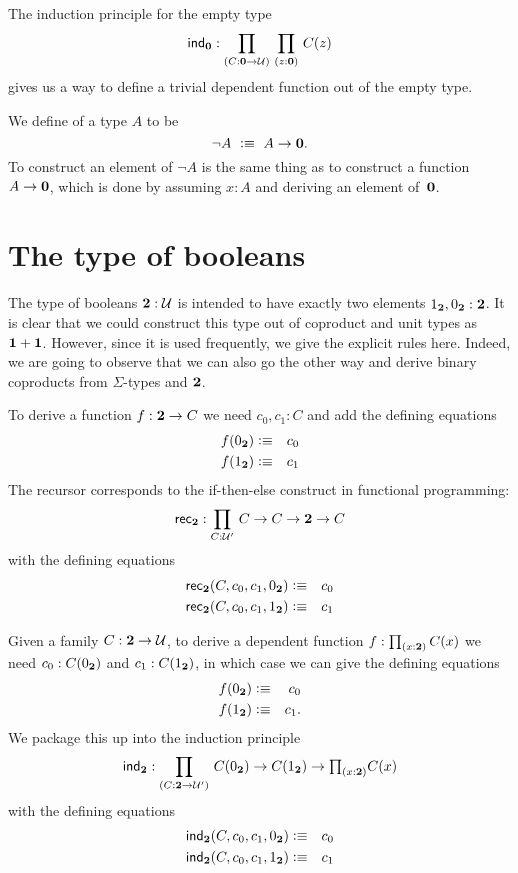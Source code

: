The induction principle for the empty type
\[ \ind{\emptyt} : \prd{C:\emptyt \to \UU}{z:\emptyt} C(z) \]
gives us a way to define a trivial dependent function out of the
empty type. %

We define  of a type $A$ to be
%
\begin{equation*}
  \neg A \ \vcentcolon\equiv\ A \to \mathbf{0}.
\end{equation*}
%
To construct an element of $\neg A$ is the same thing as to construct a function $A \to
\mathbf{0}$, which is done by assuming $x : A$ and deriving an element of~$\mathbf{0}$.

\section{The type of booleans}
\label{sec:type-booleans}

The type of booleans $\mathbf{2}:\mathcal{U}$ is intended to have exactly two elements 
${1_{\mathbf{2}}},{0_{\mathbf{2}}} : \mathbf{2}$. It is clear that we could construct this
type out of coproduct and unit types as $\mathbf{1} + \mathbf{1}$. However,
since it is used frequently, we give the explicit rules here.
Indeed, we are going to observe that we can also go the other way
and derive binary coproducts from $\Sigma$-types and $\mathbf{2}$.

To derive a function $f : \mathbf{2} \to C$ we need $c_0,c_1 : C$ and
add the defining equations
\begin{eqnarray*}
  f({0_{\mathbf{2}}}) & \vcentcolon\equiv & c_0 \\
  f({1_{\mathbf{2}}}) & \vcentcolon\equiv & c_1
\end{eqnarray*}
The recursor corresponds to the if-then-else construct in
functional programming:
\[ \rec{\bool} : \prd{C:\UU'}  C \to C \to \bool \to C \]
with the defining equations
\begin{eqnarray*}
  \mathsf{rec}_{\mathbf{2}}(C,c_0,c_1,{0_{\mathbf{2}}}) & \vcentcolon\equiv & c_0 \\
  \mathsf{rec}_{\mathbf{2}}(C,c_0,c_1,{1_{\mathbf{2}}}) & \vcentcolon\equiv & c_1
\end{eqnarray*}

Given a family $C : \mathbf{2} \to \mathcal{U}$, to derive a dependent function 
$f : \prd{x:\bool}C(x)$ we need $c_0:C({0_{\mathbf{2}}})$ and $c_1 : C({1_{\mathbf{2}}})$, in which case we can give the defining equations
\begin{eqnarray*}
  f({0_{\mathbf{2}}}) & \vcentcolon\equiv & c_0 \\
  f({1_{\mathbf{2}}}) & \vcentcolon\equiv & c_1.
\end{eqnarray*}
We package this up into the induction principle
\[ \ind{\bool} : \dprd{C:\bool \to \UU'}  C(\bfalse) \to C(\btrue)
\to \tprd{x:\bool} C(x) \]
with the defining equations
\begin{eqnarray*}
  \mathsf{ind}_{\mathbf{2}}(C,c_0,c_1,{0_{\mathbf{2}}}) & \vcentcolon\equiv & c_0 \\
  \mathsf{ind}_{\mathbf{2}}(C,c_0,c_1,{1_{\mathbf{2}}}) & \vcentcolon\equiv & c_1
\end{eqnarray*}

